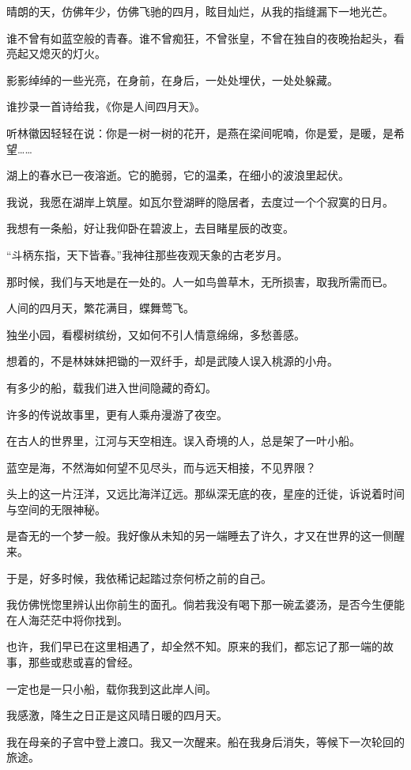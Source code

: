 		晴朗的天，仿佛年少，仿佛飞驰的四月，眩目灿烂，从我的指缝漏下一地光芒。\par
		谁不曾有如蓝空般的青春。谁不曾痴狂，不曾张皇，不曾在独自的夜晚抬起头，看亮起又熄灭的灯火。\par
		影影绰绰的一些光亮，在身前，在身后，一处处埋伏，一处处躲藏。\par
		谁抄录一首诗给我，《你是人间四月天》。\par
		听林徽因轻轻在说：你是一树一树的花开，是燕在梁间呢喃，你是爱，是暖，是希望……\par
		湖上的春水已一夜溶逝。它的脆弱，它的温柔，在细小的波浪里起伏。\par
		我说，我愿在湖岸上筑屋。如瓦尔登湖畔的隐居者，去度过一个个寂寞的日月。\par
		我想有一条船，好让我仰卧在碧波上，去目睹星辰的改变。\par
		“斗柄东指，天下皆春。”我神往那些夜观天象的古老岁月。\par
		那时候，我们与天地是在一处的。人一如鸟兽草木，无所损害，取我所需而已。\par
		人间的四月天，繁花满目，蝶舞莺飞。\par
		独坐小园，看樱树缤纷，又如何不引人情意绵绵，多愁善感。\par
		想着的，不是林妹妹把锄的一双纤手，却是武陵人误入桃源的小舟。\par
		有多少的船，载我们进入世间隐藏的奇幻。\par
		许多的传说故事里，更有人乘舟漫游了夜空。\par
		在古人的世界里，江河与天空相连。误入奇境的人，总是架了一叶小船。\par
		蓝空是海，不然海如何望不见尽头，而与远天相接，不见界限？\par
		头上的这一片汪洋，又远比海洋辽远。那纵深无底的夜，星座的迁徙，诉说着时间与空间的无限神秘。\par
		是杳无的一个梦一般。我好像从未知的另一端睡去了许久，才又在世界的这一侧醒来。\par
		于是，好多时候，我依稀记起踏过奈何桥之前的自己。\par
		我仿佛恍惚里辨认出你前生的面孔。倘若我没有喝下那一碗孟婆汤，是否今生便能在人海茫茫中将你找到。\par
		也许，我们早已在这里相遇了，却全然不知。原来的我们，都忘记了那一端的故事，那些或悲或喜的曾经。\par
		一定也是一只小船，载你我到这此岸人间。\par
		我感激，降生之日正是这风晴日暖的四月天。\par
		我在母亲的子宫中登上渡口。我又一次醒来。船在我身后消失，等候下一次轮回的旅途。\par
